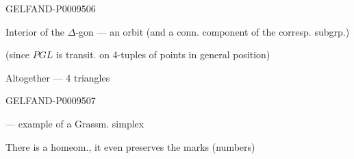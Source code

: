\begin{GelfandAdjacentEvidence}{GELFAND-P000950}{6}


Interior of the $\Delta$-gon --- an orbit (and a conn. component of the corresp. subgrp.)

(since $PGL$ is transit. on 4-tuples of points in general position)

Altogether --- 4 triangles

\end{GelfandAdjacentEvidence}
\begin{GelfandAdjacentEvidence}{GELFAND-P000950}{7}

--- example of a Grassm. simplex

There is a homeom., it even preserves the marks (numbers)
\end{GelfandAdjacentEvidence}
